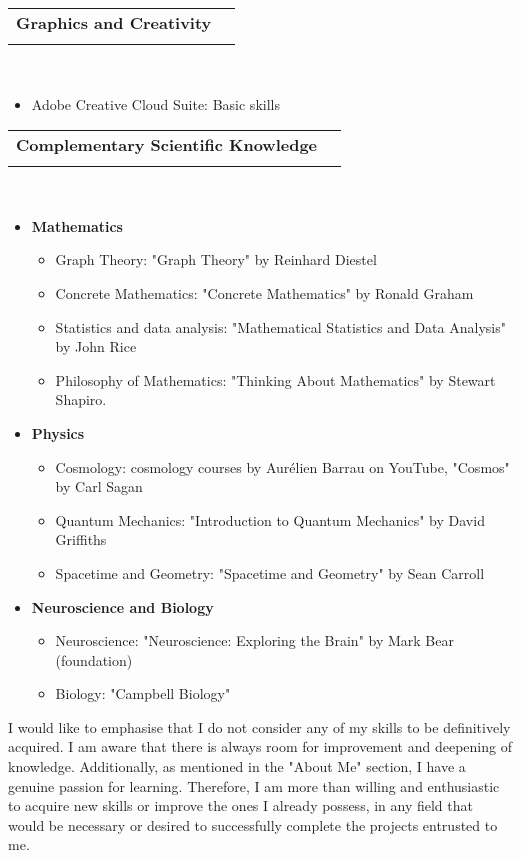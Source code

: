 \documentclass[letterpaper,11pt]{article}
\makeatletter
\newcommand{\ressubheading}[4]{
\begin{tabular*}{6.5in}{l@{\cftdotfill{\cftsecdotsep}\extracolsep{\fill}}r}
    \textbf{#1} & #2 \\
    \textit{#3} & \textit{#4} \\
\end{tabular*}\vspace{-6pt}}
\makeatother
\begin{document}
\ressubheading{Graphics and Creativity}{}{}{}\\
\vspace{-0.5cm}
\begin{itemize}[label={}]
\item Adobe Creative Cloud Suite: Basic skills
\end{itemize}

\ressubheading{Complementary Scientific Knowledge}{}{}{}\\
\vspace{-0.5cm}
\begin{itemize}[label={}]
\item \textbf{Mathematics}
\begin{itemize}[label={}]
\item Graph Theory: "Graph Theory" by Reinhard Diestel
\item Concrete Mathematics: "Concrete Mathematics" by Ronald Graham
\item Statistics and data analysis: "Mathematical Statistics and Data Analysis" by John Rice
\item Philosophy of Mathematics: "Thinking About Mathematics" by Stewart Shapiro.
\end{itemize}
\item \textbf{Physics}
\begin{itemize}[label={}]
\item Cosmology: cosmology courses by Aurélien Barrau on YouTube, "Cosmos" by Carl Sagan
\item Quantum Mechanics: "Introduction to Quantum Mechanics" by David Griffiths
\item Spacetime and Geometry: "Spacetime and Geometry" by Sean Carroll
\end{itemize}
\item \textbf{Neuroscience and Biology}
\begin{itemize}[label={}]
\item Neuroscience: "Neuroscience: Exploring the Brain" by Mark Bear (foundation)
\item Biology: "Campbell Biology"
\end{itemize}
\end{itemize}

I would like to emphasise that I do not consider any of my skills to be definitively acquired. I am aware that there is always room for improvement and deepening of knowledge. Additionally, as mentioned in the "About Me" section, I have a genuine passion for learning. Therefore, I am more than willing and enthusiastic to acquire new skills or improve the ones I already possess, in any field that would be necessary or desired to successfully complete the projects entrusted to me.
\end{document}
